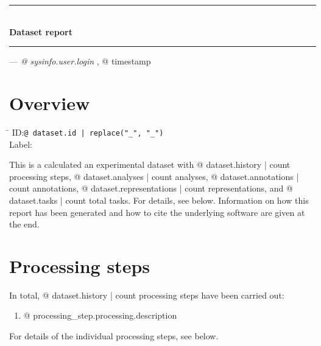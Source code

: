 

\rule[1ex]{\textwidth}{1pt}
\\[1em]
\textbf{\LARGE Dataset report}
\\[1ex]
\rule{\textwidth}{1pt}

\hfill --- \textsl{{@ sysinfo.user.login }}, {@ timestamp }

\section{Overview}

\begin{tabbing}
\hspace*{1.5cm}\=\kill
ID:\>\texttt{{@ dataset.id | replace("_", "\_") }}
\\
Label:
\end{tabbing}

This is %
a calculated %
an experimental %
dataset with
{@ dataset.history | count } processing steps,
{@ dataset.analyses | count } analyses,
{@ dataset.annotations | count } annotations,
{@ dataset.representations | count } representations, and
{@ dataset.tasks | count } total tasks.
For details, see below. Information on how this report has been generated and how to cite the underlying software are given at the end.

\section{Processing steps}

In total, {@ dataset.history | count } processing steps have been carried out:

\begin{enumerate}
\item {@ processing_step.processing.description }
\end{enumerate}

For details of the individual processing steps, see below.




